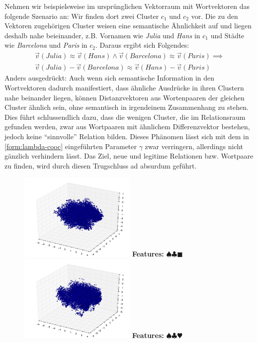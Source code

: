 \begin{itemize}
  Nehmen wir beispielsweise im ursprünglichen Vektorraum mit Wortvektoren das folgende Szenario an: Wir finden dort
  zwei Cluster $c_1$ und $c_2$ vor. Die zu den Vektoren zugehörigen Cluster weisen eine semantische Ähnlichkeit auf
  und liegen deshalb nahe beieinander, z.B. Vornamen wie \emph{Julia} und \emph{Hans} in $c_1$ und Städte wie
  \emph{Barcelona} und \emph{Paris} in $c_2$. Daraus ergibt sich Folgendes:
  \begin{equation}
    \begin{split}
      \vec{v}(Julia) \approx \vec{v}(Hans) \land \vec{v}(Barcelona) \approx \vec{v}(Paris) \implies \\
      \vec{v}(Julia) - \vec{v}(Barcelona) \approx \vec{v}(Hans) - \vec{v}(Paris)
    \end{split}
  \end{equation}
  Anders ausgedrückt: Auch wenn sich semantische Information in den Wortvektoren dadurch manifestiert, dass ähnliche
  Ausdrücke in ihren Clustern nahe beinander liegen, können Distanzvektoren aus Wortenpaaren der gleichen Cluster ähnlich sein,
  ohne semantisch in irgendeinem Zusammenhang zu stehen. Dies führt schlussendlich dazu, dass die wenigen Cluster, die
  im Relationsraum gefunden werden, zwar aus Wortpaaren mit ähnlichem Differenzvektor bestehen, jedoch keine ``sinnvolle''
  Relation bilden. Dieses Phänomen lässt sich mit dem in \ref{form:lambda-cooc} eingeführten Parameter $\gamma$ zwar verringern, allerdings nicht gänzlich
  verhindern lässt. Das Ziel, neue und legitime Relationen bzw. Wortpaare zu finden, wird durch diesen Trugschluss ad absurdum geführt.

\begin{figure}[h]
  \centering
  \begin{multicols}{2}
    \includegraphics[width=0.5\textwidth]{../img/mappings_get10000_occ100_cos.jpg}
    \textbf{Features:} $\spadesuit\clubsuit\blacksquare$
    \includegraphics[width=0.5\textwidth]{../img/mappings_get10000_occ100_eucl.jpg}
    \textbf{Features:} $\spadesuit\clubsuit\varheart$


\end{multicols}
\end{figure}
\end{itemize}
